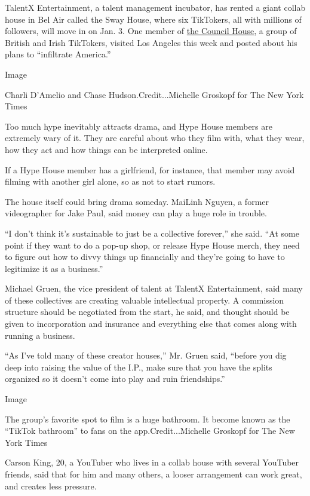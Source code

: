 TalentX Entertainment, a talent management incubator, has rented a giant
collab house in Bel Air called the Sway House, where six TikTokers, all
with millions of followers, will move in on Jan. 3. One member of
\href{https://vm.tiktok.com/CPQrX7/}{the Council House}, a group of
British and Irish TikTokers, visited Los Angeles this week and posted
about his plans to ``infiltrate America.''

Image

Charli D'Amelio and Chase Hudson.Credit...Michelle Groskopf for The New
York Times

Too much hype inevitably attracts drama, and Hype House members are
extremely wary of it. They are careful about who they film with, what
they wear, how they act and how things can be interpreted online.

If a Hype House member has a girlfriend, for instance, that member may
avoid filming with another girl alone, so as not to start rumors.

The house itself could bring drama someday. MaiLinh Nguyen, a former
videographer for Jake Paul, said money can play a huge role in trouble.

``I don't think it's sustainable to just be a collective forever,'' she
said. ``At some point if they want to do a pop-up shop, or release Hype
House merch, they need to figure out how to divvy things up financially
and they're going to have to legitimize it as a business.''

Michael Gruen, the vice president of talent at TalentX Entertainment,
said many of these collectives are creating valuable intellectual
property. A commission structure should be negotiated from the start, he
said, and thought should be given to incorporation and insurance and
everything else that comes along with running a business.

``As I've told many of these creator houses,'' Mr. Gruen said, ``before
you dig deep into raising the value of the I.P., make sure that you have
the splits organized so it doesn't come into play and ruin
friendships.''

Image

The group's favorite spot to film is a huge bathroom. It become known as
the ``TikTok bathroom'' to fans on the app.Credit...Michelle Groskopf
for The New York Times

Carson King, 20, a YouTuber who lives in a collab house with several
YouTuber friends, said that for him and many others, a looser
arrangement can work great, and creates less pressure.

